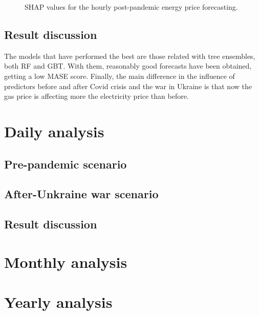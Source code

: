 \begin{figure}[H]
    \caption{SHAP values for the hourly post-pandemic energy price forecasting.}
    \label{fig:shap-hourly-post}
\end{figure}


\subsection{Result discussion}
The models that have performed the best are those related with tree ensembles, both RF and GBT. With them, reasonably good forecasts have been obtained, getting a low MASE score. Finally, the main difference in the influence of predictors before and after Covid crisis and the war in Ukraine is that now the gas price is affecting more the electricity price than before.


\section{Daily analysis}

\subsection{Pre-pandemic scenario}

\subsection{After-Unkraine war scenario}

\subsection{Result discussion}


\section{Monthly analysis}


\section{Yearly analysis}